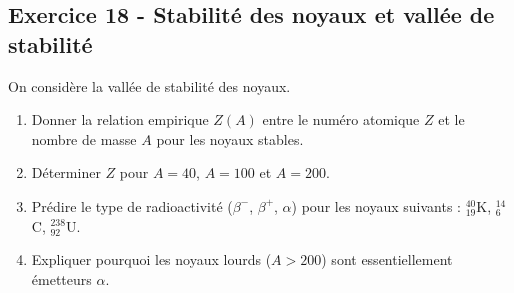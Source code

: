 \documentclass[12pt,a4paper]{article}
\begin{document}
\subsection*{Exercice 18 - Stabilité des noyaux et vallée de stabilité \niveau{\moyen}}

\begin{boiteexercice}
On considère la vallée de stabilité des noyaux.
\begin{enumerate}
  \item Donner la relation empirique $Z(A)$ entre le numéro atomique $Z$ et le nombre de masse $A$ pour les noyaux stables.
  \item Déterminer $Z$ pour $A = 40$, $A = 100$ et $A = 200$.
  \item Prédire le type de radioactivité ($\beta^-$, $\beta^+$, $\alpha$) pour les noyaux suivants : ${}^{40}_{19}$K, ${}^{14}_{6}$C, ${}^{238}_{92}$U.
  \item Expliquer pourquoi les noyaux lourds ($A > 200$) sont essentiellement émetteurs $\alpha$.
\end{enumerate}
\end{boiteexercice}
\end{document}
